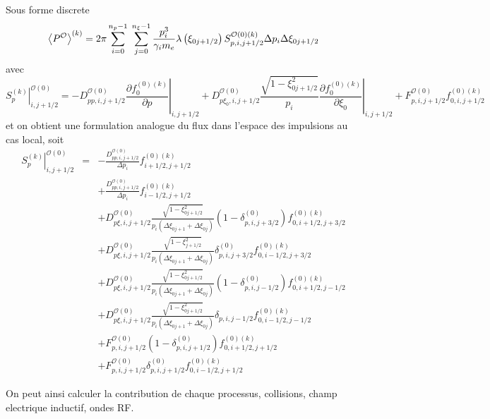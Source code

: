 Sous forme discrete \[
\bigskip\left\langle P^{\mathcal{O}}\right\rangle ^{(k)}=2\pi\sum_{i=0}^{n_{p}-1}\;\sum_{j=0}^{n_{\xi}-1}\frac{p_{i}^{3}}{\gamma_{i}m_{e}}\lambda\left(\xi_{0j+1/2}\right)S_{p,i,j+1/2}^{\mathcal{O}(0)(k)}\Delta p_{i}\Delta\xi_{0j+1/2}\]
 avec \[
\left.S_{p}^{(k)}\right|_{i,j+1/2}^{\mathcal{O}(0)}=-D_{pp,i,j+1/2}^{\mathcal{O}(0)}\left.\frac{\partial f_{0}^{(0)(k)}}{\partial p}\right|_{i,j+1/2}+D_{p\xi_{0},i,j+1/2}^{\mathcal{O}(0)}\frac{\sqrt{1-\xi_{0j+1/2}^{2}}}{p_{i}}\left.\frac{\partial f_{0}^{(0)(k)}}{\partial\xi_{0}}\right|_{i,j+1/2}+F_{p,i,j+1/2}^{\mathcal{O}(0)}f_{0,i,j+1/2}^{(0)(k)}\]
 et on obtient une formulation analogue du flux dans l'espace des
impulsions au cas local, soit \begin{eqnarray*}
\left.S_{p}^{\left(k\right)}\right|_{i,j+1/2}^{\mathcal{O}(0)} & = & -\frac{D_{pp,i,j+1/2}^{\mathcal{O}(0)}}{\Delta p_{i}}f_{i+1/2,j+1/2}^{(0)(k)}\\
 &  & +\frac{D_{pp,i,j+1/2}^{\mathcal{O}(0)}}{\Delta p_{i}}f_{i-1/2,j+1/2}^{(0)(k)}\\
 &  & +D_{p\xi,i,j+1/2}^{\mathcal{O}(0)}\frac{\sqrt{1-\xi_{0j+1/2}^{2}}}{p_{i}\left(\Delta\xi_{0j+1}+\Delta\xi_{0j}\right)}\left(1-\delta_{p,i,j+3/2}^{(0)}\right)f_{0,i+1/2,j+3/2}^{(0)(k)}\\
 &  & +D_{p\xi,i,j+1/2}^{\mathcal{O}(0)}\frac{\sqrt{1-\xi_{j+1/2}^{2}}}{p_{i}\left(\Delta\xi_{0j+1}+\Delta\xi_{0j}\right)}\delta_{p,i,j+3/2}^{(0)}f_{0,i-1/2,j+3/2}^{(0)(k)}\\
 &  & +D_{p\xi,i,j+1/2}^{\mathcal{O}(0)}\frac{\sqrt{1-\xi_{0j+1/2}^{2}}}{p_{i}\left(\Delta\xi_{0j+1}+\Delta\xi_{0j}\right)}\left(1-\delta_{p,i,j-1/2}^{(0)}\right)f_{0,i+1/2,j-1/2}^{(0)(k)}\\
 &  & +D_{p\xi,i,j+1/2}^{\mathcal{O}(0)}\frac{\sqrt{1-\xi_{0j+1/2}^{2}}}{p_{i}\left(\Delta\xi_{0j+1}+\Delta\xi_{0j}\right)}\delta_{p,i,j-1/2}f_{0,i-1/2,j-1/2}^{(0)(k)}\\
 &  & +F_{p,i,j+1/2}^{\mathcal{O}(0)}\left(1-\delta_{p,i,j+1/2}^{(0)}\right)f_{0,i+1/2,j+1/2}^{(0)(k)}\\
 &  & +F_{p,i,j+1/2}^{\mathcal{O}(0)}\delta_{p,i,j+1/2}^{(0)}f_{0,i-1/2,j+1/2}^{(0)(k)}\end{eqnarray*}


On peut ainsi calculer la contribution de chaque processus, collisions,
champ electrique inductif, ondes RF.
